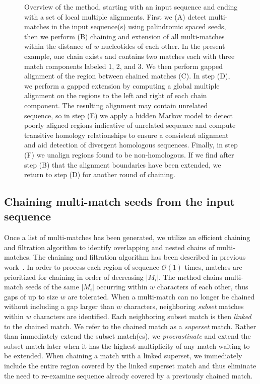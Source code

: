 \documentclass[12pt,journal,draftcls,letterpaper,onecolumn]{IEEEtran}
\begin{document}
\begin{figure}[t!]
\begin{center}
\end{center}
\caption
{Overview of the method, starting with an input sequence and ending
with a set of local multiple alignments. First we (A) detect
multi-matches in the input sequence(s) using palindromic spaced seeds,
then we perform (B) chaining and extension of all multi-matches within
the distance of $w$ nucleotides of each other.  In the present example, one chain exists and
contains two matches each with three match components labeled 1, 2,
and 3.  We then perform gapped alignment of the region between chained
matches (C).  In step (D), we perform a gapped extension by computing
a global multiple alignment on the regions to the left and right of
each chain component.  The resulting alignment may contain unrelated
sequence, so in step (E) we apply a hidden Markov model to detect
poorly aligned regions indicative of unrelated sequence and
compute transitive homology relationships to ensure a consistent
alignment and aid detection of divergent homologous sequences.
Finally, in step (F) we unalign regions found to be non-homologous.
If we find after step (B) that the alignment boundaries have been
extended, we return to step (D) for another round of chaining.}
\label{fig-main}
\end{figure}

\subsection{Chaining multi-match seeds from the input sequence}
Once a list of multi-matches has been generated, we utilize an
efficient chaining and filtration algorithm to identify overlapping
and nested chains of multi-matches.  The chaining and filtration algorithm has been described in previous work~\cite{ref-procrast}. In order to
process each region of sequence $\mathcal{O}(1)$ times, matches
are prioritized for chaining in order of decreasing $|M_i|$.  The
method chains multi-match seeds of the same $|M_i|$
occurring within $w$ characters of each other, thus gaps of up to size
$w$ are tolerated.  When a multi-match can
no longer be chained without including a gap larger than $w$
characters, neighboring \textit{subset} matches within $w$ characters
are identified. Each neighboring subset match is then \textit{linked}
to the chained match. We refer to the chained match as a
\textit{superset} match. Rather than immediately extend the subset
match(es), we \textit{procrastinate} and extend the subset match later
when it has the highest multiplicity of any match waiting to be
extended. When chaining a match with a linked superset, we immediately
include the entire region covered by the linked superset match and
thus eliminate the need to re-examine sequence already covered by a
previously chained match.
\end{document}
